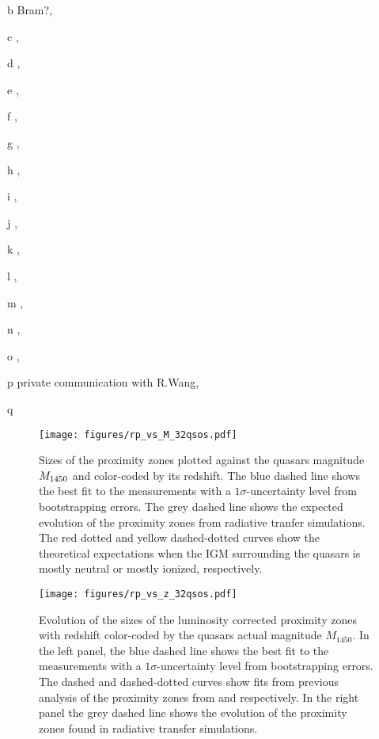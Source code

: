 \documentclass[iop]{emulateapj}
\begin{document}
{\begin{ThreePartTable}
\begin{tablenotes}
\item[b] {\footnotesize Bram?}, %
\item[c] {\footnotesize \citet{Carilli2010}}, 
\item[d] {\footnotesize \citet{Becker2015}}, 
\item[e] {\footnotesize \citet{Wang2013}}, 
\item[f] {\footnotesize \citet{Jiang2008}}, 
\item[g] {\footnotesize \citet{Willott2015}}, 
\item[h] {\footnotesize \citet{Willott2010b}}, 
\item[i] {\footnotesize \citet{DeRosa2011}}, 
\item[j] {\footnotesize \citet{Jiang2007}}, 
\item[k] {\footnotesize \citet{Kurk2007}}, 
\item[l] {\footnotesize \citet{Wang2010}}, 
\item[m] {\footnotesize \citet{Willott2013}},
\item[n] {\footnotesize \citet{Wang2016}}, 
\item[o] {\footnotesize \citet{Banados2016}}, 
\item[p] {\footnotesize private communication with R.Wang}, 
\item[q] {\footnotesize \citet{Willott2009}}
\end{tablenotes}
\end{ThreePartTable}}


\begin{figure}[t]
\centering
\texttt{[image: figures/rp\_vs\_M\_32qsos.pdf]}
\caption{Sizes of the proximity zones plotted against the quasars magnitude $M_{\rm 1450}$ and color-coded by its redshift. The blue dashed line shows the best fit to the measurements with a $1\sigma$-uncertainty level from bootstrapping errors. The grey dashed line shows the expected evolution of the proximity zones from radiative tranfer simulations. The red dotted and yellow dashed-dotted curves show the theoretical expectations when the IGM surrounding the quasars is mostly neutral or mostly ionized, respectively. \label{fig:RpvsM}} 
\end{figure}


\begin{figure*}[t]
\centering
\texttt{[image: figures/rp\_vs\_z\_32qsos.pdf]}
\caption{Evolution of the sizes of the luminosity corrected proximity zones with redshift color-coded by the quasars actual magnitude $M_{1450}$. In the left panel, the blue dashed line shows the best fit to the measurements with a $1\sigma$-uncertainty level from bootstrapping errors. The dashed and dashed-dotted curves show fits from previous analysis of the proximity zones from \citet{Carilli2010} and \citet{Venemans2015} respectively. In the right panel the grey dashed line shows the evolution of the proximity zones found in radiative transfer simulations. \label{fig:Rpvsz}} 
\end{figure*}
\end{document}
